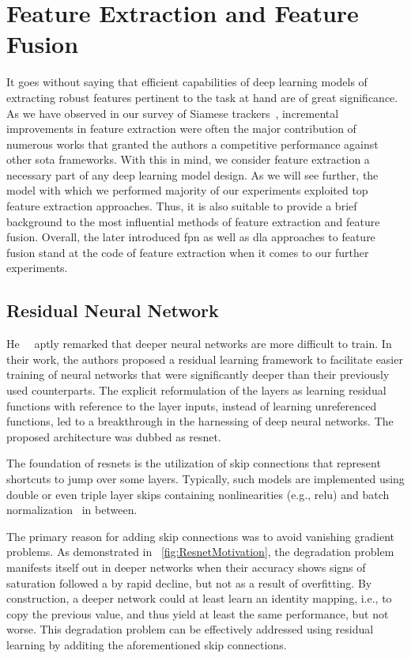 \section{Feature Extraction and Feature Fusion}
\label{sec:FeatureExtractionFusion}

It goes without saying that efficient capabilities of deep learning models of extracting robust features pertinent to the task at hand are of great significance. As we have observed in our survey of Siamese trackers~\cite{ondrasovic2021siamese}, incremental improvements in feature extraction were often the major contribution of numerous works that granted the authors a competitive performance against other \gls{sota} frameworks. With this in mind, we consider feature extraction a necessary part of any deep learning model design. As we will see further, the model with which we performed majority of our experiments exploited top feature extraction approaches. Thus, it is also suitable to provide a brief background to the most influential methods of feature extraction and feature fusion. Overall, the later introduced \gls{fpn} as well as \gls{dla} approaches to feature fusion stand at the code of feature extraction when it comes to our further experiments.

\subsection{Residual Neural Network}
\label{ssec:ResidualNeuralNet}

He~\etal{}~\cite{he2015resnet} aptly remarked that deeper neural networks are more difficult to train. In their work, the authors proposed a residual learning framework to facilitate easier training of neural networks that were significantly deeper than their previously used counterparts. The explicit reformulation of the layers as learning residual functions with reference to the layer inputs, instead of learning unreferenced functions, led to a breakthrough in the harnessing of deep neural networks. The proposed architecture was dubbed as \gls{resnet}.

The foundation of \glspl{resnet} is the utilization of skip connections that represent shortcuts to jump over some layers. Typically, such models are implemented using double or even triple layer skips containing nonlinearities (e.g., \gls{relu}) and batch normalization~\cite{ioffe2015batchnorm} in between.

The primary reason for adding skip connections was to avoid vanishing gradient problems. As demonstrated in \figstr{}~\ref{fig:ResnetMotivation}, the degradation problem manifests itself out in deeper networks when their accuracy shows signs of saturation followed a by rapid decline, but not as a result of overfitting. By construction, a deeper network could at least learn an identity mapping, i.e., to copy the previous value, and thus yield at least the same performance, but not worse. This degradation problem can be effectively addressed using residual learning by additing the aforementioned skip connections.

